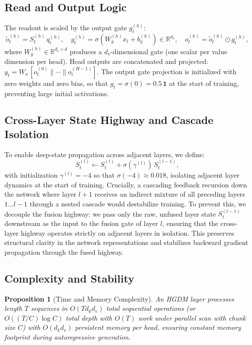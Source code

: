 \documentclass{article}
\newtheorem{proposition}{Proposition}
\newcommand{\R}{\mathbb{R}}
\begin{document}
\subsection{Read and Output Logic}
The readout is scaled by the output gate $g^{(h)}_t$:
\begin{equation}
  \tilde{o}^{(h)}_t = S^{(h)}_t\, q^{(h)}_t, \quad g^{(h)}_t = \sigma(W_g^{(h)} x_t + b_g^{(h)}) \in \R^{d_v}, \quad o^{(h)}_t = \tilde{o}^{(h)}_t \odot g^{(h)}_t,
\end{equation}
where $W_g^{(h)} \in \R^{d_v \times d}$ produces a $d_v$-dimensional gate (one scalar per value dimension per head). Head outputs are concatenated and projected: $y_t = W_o\,[o^{(0)}_t \|\cdots\| o^{(H-1)}_t]$. The output gate projection is initialized with zero weights and zero bias, so that $g_t = \sigma(0) = 0.5\,\mathbf{1}$ at the start of training, preventing large initial activations.

\subsection{Cross-Layer State Highway and Cascade Isolation}
To enable deep-state propagation across adjacent layers, we define:
\begin{equation}
  S^{(l)}_t \leftarrow S^{(l)}_t + \sigma(\gamma^{(l)})\, S^{(l-1)}_t,
\end{equation}
with initialization $\gamma^{(l)} = -4$ so that $\sigma(-4) \approx 0.018$, isolating adjacent layer dynamics at the start of training.
Crucially, a cascading feedback recursion down the network where layer $l+1$ receives an indirect mixture of all preceding layers $1 \dots l-1$ through a nested cascade would destabilize training. To prevent this, we decouple the fusion highway: we pass only the raw, unfused layer state $S^{(l-1)}_t$ downstream as the input to the fusion gate of layer $l$, ensuring that the cross-layer highway operates strictly on adjacent layers in isolation. This preserves structural clarity in the network representations and stabilizes backward gradient propagation through the fused highway.

\subsection{Complexity and Stability}
\begin{proposition}[Time and Memory Complexity]
An HGDM layer processes length $T$ sequences in $O(T d_k d_v)$ total sequential operations (or $O((T/C) \log C)$ total depth with $O(T)$ work under parallel scan with chunk size $C$) with $O(d_k d_v)$ persistent memory per head, ensuring constant memory footprint during autoregressive generation.
\end{proposition}
\end{document}
